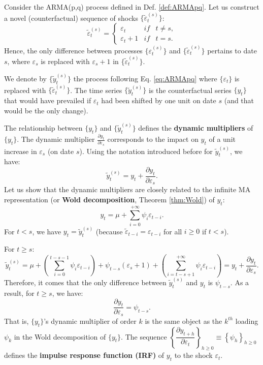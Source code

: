 \documentclass[
  11pt,
]{book}
\theoremstyle{definition}
\theoremstyle{definition}
\theoremstyle{definition}
\theoremstyle{definition}
\theoremstyle{remark}
\begin{document}
Consider the ARMA(p,q) process defined in Def. \ref{def:ARMApq}. Let us construct a novel (counterfactual) sequence of shocks \(\{\tilde\varepsilon_t^{(s)}\}\):
\[
\tilde\varepsilon_t^{(s)} = \left\{
\begin{array}{lcc}
\varepsilon_{t} & if & t \ne s,\\
\varepsilon_{t} + 1 &if& t=s.
\end{array}
\right.
\]
Hence, the only difference between processes \(\{\varepsilon_t^{(s)}\}\) and \(\{\tilde\varepsilon_t^{(s)}\}\) pertains to date \(s\), where \(\varepsilon_s\) is replaced with \(\varepsilon_s + 1\) in \(\{\tilde\varepsilon_t^{(s)}\}\).

We denote by \(\{\tilde{y}_t^{(s)}\}\) the process following Eq. \eqref{eq:ARMApq} where \(\{\varepsilon_t\}\) is replaced with \(\{\tilde\varepsilon_t^{(s)}\}\). The time series \(\{\tilde{y}_t^{(s)}\}\) is the counterfactual series \(\{y_t\}\) that would have prevailed if \(\varepsilon_t\) had been shifted by one unit on date \(s\) (and that would be the only change).

The relationship between \(\{y_t\}\) and \(\{\tilde{y}_t^{(s)}\}\) defines the \textbf{dynamic multipliers} of \(\{y_t\}\). The dynamic multiplier \(\frac{\partial y_t}{\partial \varepsilon_{s}}\) corresponds to the impact on \(y_t\) of a unit increase in \(\varepsilon_s\) (on date \(s\)). Using the notation introduced before for \(\tilde{y}_t^{(s)}\), we have:
\[
\tilde{y}_t^{(s)} = y_t + \frac{\partial y_t}{\partial \varepsilon_{s}}.
\]
Let us show that the dynamic multipliers are closely related to the infinite MA representation (or \textbf{Wold decomposition}, Theorem \ref{thm:Wold}) of \(y_t\):
\[
y_t = \mu + \sum_{i=0}^{+\infty} \psi_i \varepsilon_{t-i}.
\]
For \(t<s\), we have \(y_t = \tilde{y}_t^{(s)}\) (because \(\tilde{\varepsilon}_{t-i}= \varepsilon_{t-i}\) for all \(i \ge 0\) if \(t<s\)).

For \(t \ge s\):
\[
\tilde{y}_t^{(s)} = \mu + \left( \sum_{i=0}^{t-s-1} \psi_i \varepsilon_{t-i} \right) + \psi_{t-s}(\varepsilon_{s}+1) + \left( \sum_{i=t-s+1}^{+\infty} \psi_i \varepsilon_{t-i} \right)=y_t + \frac{\partial y_t}{\partial \varepsilon_{s}}.
\]
Therefore, it comes that the only difference between \(\tilde{y}_t^{(s)}\) and \(y_t\) is \(\psi_{t-s}\). As a result, for \(t \ge s\), we have:
\[
\boxed{\dfrac{\partial y_t}{\partial \varepsilon_{s}}=\psi_{t-s}.}
\]
That is, \(\{y_t\}\)'s dynamic multiplier of order \(k\) is the same object as the \(k^{th}\) loading \(\psi_k\) in the Wold decomposition of \(\{y_t\}\). The sequence \(\left\{\dfrac{\partial y_{t+h}}{\partial \varepsilon_{t}}\right\}_{h \ge 0} \equiv \left\{\psi_h\right\}_{h \ge 0}\) defines the \textbf{impulse response function (IRF)} of \(y_t\) to the shock \(\varepsilon_t\).
\end{document}
